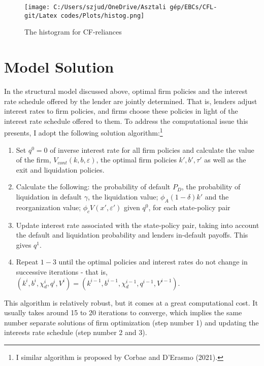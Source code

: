 \documentclass[12pt]{article}
\begin{document}
\begin{figure}[H]  %
    \centering
    \texttt{[image: C:/Users/szjud/OneDrive/Asztali gép/EBCs/CFL-git/Latex codes/Plots/histog.png]}
    \caption{The histogram for CF-reliances} \label{chart:histog}
\end{figure}


\newpage

\appendix
\section{Model Solution \label{sec: qualitative analysis}}

In the structural model discussed above, optimal firm policies and the interest rate schedule offered by the lender are jointly determined. That is, lenders adjust interest rates to firm policies, and firms choose these policies in light of the interest rate schedule offered to them. To address the computational issue this presents, I adopt the following solution algorithm:\footnote{I similar algorithm is proposed by Corbae and D'Erasmo (2021).}
\begin{enumerate}
    \item Set $q^0 = 0$ of inverse interest rate for all firm policies and calculate the value of the firm, $V_{cont}(k,b,\varepsilon)$, the optimal firm policies $k', b', \tau'$ as well as the exit and liquidation policies. 
    \item Calculate the following: the probability of default $P_D$, the probability of liquidation in default $\gamma$, the liquidation value; $\phi_A (1-\delta) k'$ and the reorganization value; $\phi_c V (x', \varepsilon')$ given $q^0$, for each state-policy pair
    \item Update interest rate associated with the state-policy pair, taking into account the default and liquidation probability and lenders in-default payoffs. This gives $q^1$. 
    \item Repeat $1-3$ until the optimal policies and interest rates do not change in successive iterations - that is, $ (k^{i},b^{i},\chi_d^{i},q^{i}, V^{i}) = (k^{i-1},b^{i-1},\chi_d^{i-1}, q^{i-1}, V^{i-1}) $.
\end{enumerate}
This algorithm is relatively robust, but it comes at a great computational cost. It usually takes around 15 to 20 iterations to converge, which implies the same number separate solutions of firm optimization (step number 1) and updating the interests rate schedule (step number 2 and 3). 
\end{document}

